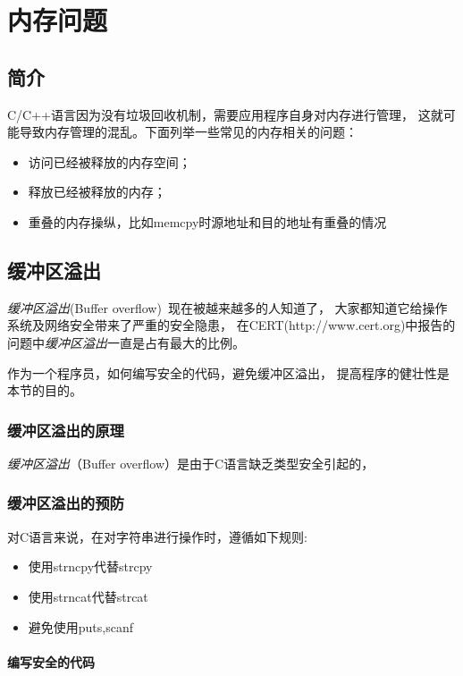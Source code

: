 \chapter{内存问题}
\section{简介}
C/C++语言因为没有垃圾回收机制，需要应用程序自身对内存进行管理，
这就可能导致内存管理的混乱。下面列举一些常见的内存相关的问题：

\begin{itemize}
\item 访问已经被释放的内存空间；
\item 释放已经被释放的内存；
\item 重叠的内存操纵，比如memcpy时源地址和目的地址有重叠的情况
\end{itemize}

\section{缓冲区溢出}

\emph{缓冲区溢出}(Buffer overflow)~现在被越来越多的人知道了，
大家都知道它给操作系统及网络安全带来了严重的安全隐患，
在CERT(http://www.cert.org)中报告的问题中\emph{缓冲区溢出}一直是占有最大的比例。

作为一个程序员，如何编写安全的代码，避免缓冲区溢出，
提高程序的健壮性是本节的目的。

\subsection{缓冲区溢出的原理}
\emph{缓冲区溢出}（Buffer overflow）是由于C语言缺乏类型安全引起的，

\subsection{缓冲区溢出的预防}

对C语言来说，在对字符串进行操作时，遵循如下规则:

\begin{itemize}
\item 使用strncpy代替strcpy
\item 使用strncat代替strcat
\item 避免使用puts,scanf
\end{itemize}

\subsubsection{编写安全的代码}


